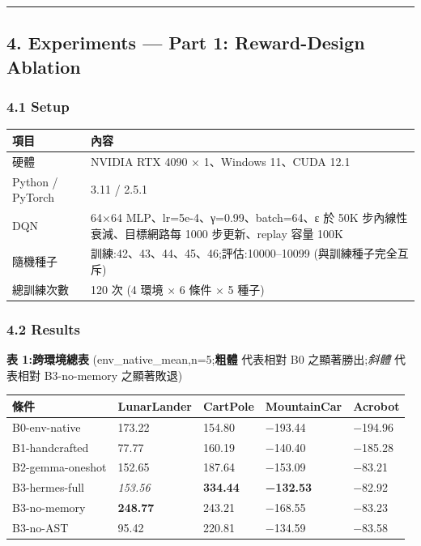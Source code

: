 \begin{center}\rule{0.5\linewidth}{0.5pt}\end{center}

\subsection{4. Experiments --- Part 1: Reward-Design Ablation}\label{4-experiments--part-1-reward-design-ablation}

\subsubsection{4.1 Setup}\label{41-setup}

{\def\LTcaptype{none} %
\begin{longtable}[]{@{}ll@{}}
\toprule\noalign{}
項目 & 內容 \\
\midrule\noalign{}
\endhead
\bottomrule\noalign{}
\endlastfoot
硬體 & NVIDIA RTX 4090 × 1、Windows 11、CUDA 12.1 \\
Python / PyTorch & 3.11 / 2.5.1 \\
DQN & 64×64 MLP、lr=5e-4、γ=0.99、batch=64、ε 於 50K 步內線性衰減、目標網路每 1000 步更新、replay 容量 100K \\
隨機種子 & 訓練:42、43、44、45、46;評估:10000--10099 (與訓練種子完全互斥) \\
總訓練次數 & 120 次 (4 環境 × 6 條件 × 5 種子) \\
\end{longtable}
}

\subsubsection{4.2 Results}\label{42-results}

\textbf{表 1:跨環境總表} (env\_native\_mean,n=5;\textbf{粗體} 代表相對 B0 之顯著勝出;\emph{斜體} 代表相對 B3-no-memory 之顯著敗退)

{\def\LTcaptype{none} %
\begin{longtable}[]{@{}lllll@{}}
\toprule\noalign{}
條件 & LunarLander & CartPole & MountainCar & Acrobot \\
\midrule\noalign{}
\endhead
\bottomrule\noalign{}
\endlastfoot
B0-env-native & 173.22 & 154.80 & −193.44 & −194.96 \\
B1-handcrafted & 77.77 & 160.19 & −140.40 & −185.28 \\
B2-gemma-oneshot & 152.65 & 187.64 & −153.09 & −83.21 \\
B3-hermes-full & \emph{153.56} & \textbf{334.44} & \textbf{−132.53} & −82.92 \\
B3-no-memory & \textbf{248.77} & 243.21 & −168.55 & −83.23 \\
B3-no-AST & 95.42 & 220.81 & −134.59 & −83.58 \\
\end{longtable}
}

